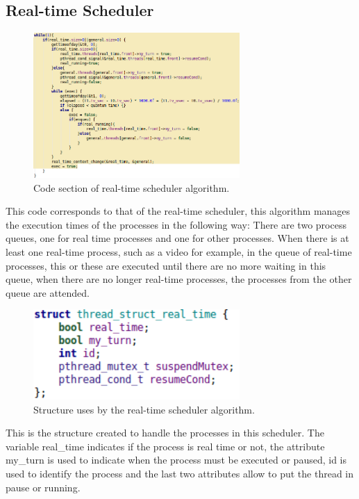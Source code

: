 \documentclass{article}
\begin{document}
\subsection{Real-time Scheduler}
\begin{figure}[H]
	\centering
	\captionsetup{justification=centering, margin=1cm}
    \includegraphics[width = 0.7\textwidth]{realtime.png}
    \caption{Code section of real-time scheduler algorithm.}
	\label{fig:realtime}
\end{figure}
This code corresponds to that of the real-time scheduler, this algorithm manages the execution times of the processes in the following way:
There are two process queues, one for real time processes and one for other processes. When there is at least one real-time process, such as a video for example, in the queue of real-time processes, this or these are executed until there are no more waiting in this queue, when there are no longer real-time processes, the processes from the other queue are attended.
\begin{figure}[H]
	\centering
	\captionsetup{justification=centering, margin=1cm}
    \includegraphics[width = 0.7\textwidth]{structRealtime.png}
    \caption{Structure uses by the real-time scheduler algorithm.}
	\label{fig:structRealtime}
\end{figure}
This is the structure created to handle the processes in this scheduler. The variable real\_time indicates if the process is real time or not, the attribute my\_turn is used to indicate when the process must be executed or paused, id is used to identify the process and the last two attributes allow to put the thread in pause or running.
\end{document}
